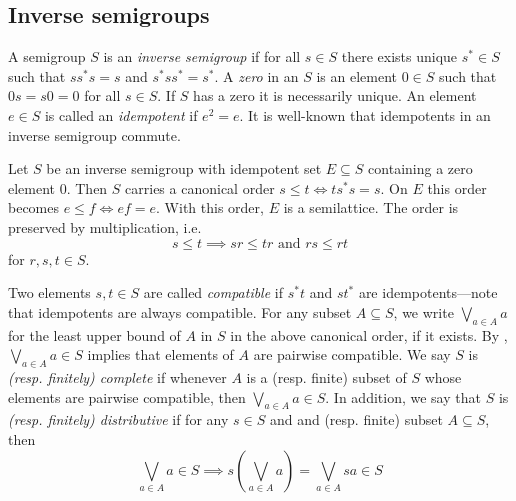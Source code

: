\documentclass[12pt]{amsart}
\theoremstyle{definition}
\theoremstyle{remark}
\numberwithin{equation}{section}
\begin{document}
	\subsection{Inverse semigroups}
	
	A semigroup $S$ is an {\em inverse semigroup} if for all $s\in S$ there exists unique $s^*\in S$ such that $ss^*s = s$ and $s^*ss^* = s^*$. A {\em zero} in an $S$ is an element $0\in S$ such that $0s = s0 = 0$ for all $s\in S$. If $S$ has a zero it is necessarily unique. An element $e\in S$ is called an {\em idempotent} if $e^2 = e$. It is well-known that idempotents in an inverse semigroup commute. 
	
	Let $S$ be an inverse semigroup with idempotent set $E\subseteq S$ containing a zero element 0. Then $S$ carries a canonical order $s\leqslant t \iff ts^*s = s$. On $E$ this order becomes $e\leqslant f \iff ef = e$. With this order, $E$ is a semilattice. The order is preserved by multiplication, i.e. 
	\[
	s\leqslant t \implies sr\leqslant tr\text{ and }rs\leqslant rt
	\]
	for $r,s,t\in S$. 
	
	Two elements $s,t\in S$ are called {\em compatible} if $s^*t$ and $st^*$ are idempotents---note that idempotents are always compatible. For any subset $A\subseteq S$, we write $\bigvee_{a\in A}a$ for the least upper bound of $A$ in $S$ in the above canonical order, if it exists. By \cite[Lemma~ 1.1.6]{La98}, $\bigvee_{a\in A}a\in S$ implies that elements of $A$ are pairwise compatible. We say $S$ is {\em (resp. finitely) complete} if whenever $A$ is a (resp. finite) subset of $S$ whose elements are pairwise compatible, then $\bigvee_{a\in A}a\in S$. In addition, we say that $S$ is {\em (resp. finitely) distributive} if for any $s\in S$ and and (resp. finite) subset $A\subseteq S$, then 
	\[
	\bigvee_{a\in A}a\in S \implies s\left(\bigvee_{a\in A}a\right) = \bigvee_{a\in A}sa\in S
	\]
	
\end{document}
